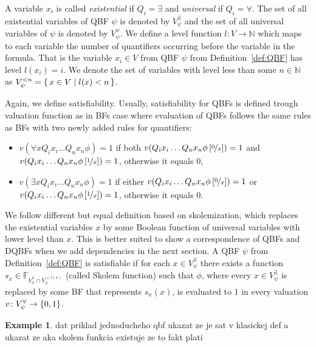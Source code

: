 \documentclass[
  digital, %
  twoside, %
  table,   %
  nolof,     %
  nolot,     %
]{fithesis3}
\let\setbuilder\set
\newcommand{\simpleset}[1]{\{{#1}\}}
\renewcommand{\set}[1]{\normalexpandarg\IfSubStr{#1}{|}{\setbuilder{#1}}{\simpleset{#1}}}
\theoremstyle{definition}
\newtheorem{example}{Example}
\theoremstyle{remark}
\newcommand{\substitute}[2]{\left[ \nicefrac{#2}{#1} \right]}
\newcommand{\BFuncs}[1]{\mathbb{F}_{#1}}
\newcommand{\evars}[1]{V_{#1}^{\exists}}
\newcommand{\uvars}[1]{V_{#1}^{\forall}}
\begin{document}
A variable $x_i$ is called \emph{existential} if $Q_i = \exists$ and \emph{universal} if $Q_i = \forall$. The set of all existential variables of QBF $\psi$ is denoted by $\evars{\psi}$ and the set of all universal variables of $\psi$ is denoted by $\uvars{\psi}$. We define a level function $l\colon V \to \mathbb{N}$ which maps to each variable the number of quantifiers occurring before the variable in the formula. That is the variable $x_i \in V$ from QBF $\psi$ from Definition~\ref{def:QBF} has level $l(x_i) = i$. We denote the set of variables with level less than some $n \in \mathbb{N}$ as $V_{\psi}^{<n} = \set{x \in V | l(x) < n}$.

Again, we define satisfiability. Usually, satisfiability for QBFs is defined trough valuation function as in BFs case where evaluation of QBFs follows the same rules as BFs with two newly added rules for quantifiers:
\begin{itemize}
    \item $v(\forall x Q_i x_i \dots Q_n x_n \phi) = 1$ if both $v(Q_i x_i \dots Q_n x_n \phi\substitute{x}{0}) = 1$ and $v(Q_i x_i \dots Q_n x_n \phi\substitute{x}{1}) = 1$, otherwise it equals $0$,
    \item $v(\exists x Q_i x_i \dots Q_n x_n \phi) = 1$ if either $v(Q_i x_i \dots Q_n x_n \phi\substitute{x}{0}) = 1$ or $v(Q_i x_i \dots Q_n x_n \phi\substitute{x}{1}) = 1$, otherwise it equals $0$.
\end{itemize}
We follow different but equal definition based on skolemization, which replaces the existential variables $x$ by some Boolean function of universal variables with lower level than $x$. This is better suited to show a correspondence of QBFs and DQBFs when we add dependencies in the next section. A QBF $\psi$ from Definition~\ref{def:QBF} is satisfiable if for each $x \in V_{\psi}^{\exists}$ there exists a function $s_{x} \in \BFuncs{\uvars{\psi}\cap V_{\psi}^{<l(x)}}$ (called Skolem function) such that $\phi$, where every $x \in \evars{\psi}$ is replaced by some BF that represents $s_x(x)$, is evaluated to $1$ in every valuation $v\colon \uvars{\psi} \to \set{0,1}$.

\begin{example}
dat priklad jednoducheho qbf ukazat ze je sat v klasickej def a ukazat ze aka skolem funkcia existuje ze to fakt plati
\end{example}
\end{document}
